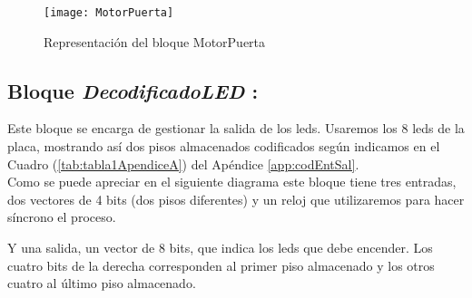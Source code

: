 	\begin{figure}[H]
		    \centering
		    \texttt{[image: MotorPuerta]}
		    \caption{Representación del bloque MotorPuerta}
		    \label{fig:MotorPuerta}
	\end{figure}

\subsection {Bloque \textit{DecodificadoLED} :} \label{bloque:DecodificadorLED}
    Este bloque se encarga de gestionar la salida de los leds. Usaremos los 8 leds de la placa, mostrando así dos pisos almacenados codificados según indicamos en el Cuadro (\ref{tab:tabla1ApendiceA}) del Apéndice \ref{app:codEntSal}. \\
    
	Como se puede apreciar en el siguiente diagrama este bloque tiene tres entradas, dos vectores de 4 bits (dos pisos diferentes) y un reloj que utilizaremos para hacer síncrono el proceso.
	
	Y una salida, un vector de 8 bits, que indica los leds que debe encender. Los cuatro bits de la derecha corresponden al primer piso almacenado y los otros cuatro al último piso almacenado.
    
	